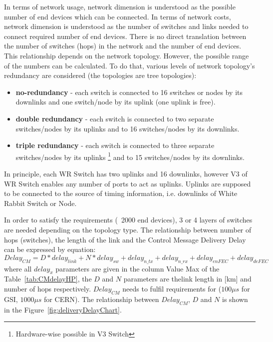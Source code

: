 In terms of network usage, network dimension is understood as the
possible number of end devices which can be connected. In terms of
network costs, network dimension is understood as the number of switches and
links needed to connect required number of end devices. There is no direct
translation between the number of switches (hops) in the network and the number
of end devices. This relationship depends on the network topology. However, the
possible range of the numbers can be calculated. To do that, various levels of
network topology's redundancy are considered (the topologies are tree
topologies):
\begin{itemize}
  \item \textbf{no-redundancy} - each switch is connected to 16 switches
or nodes by its downlinks and one switch/node by its uplink (one uplink is
free). 
  \item \textbf{double redundancy} - each switch is connected to two
separate switches/nodes by its uplinks and to 16 switches/nodes by its
downlinks. 
  \item \textbf{triple redundancy} - each switch is connected to three separate
switches/nodes by its uplinks \footnote{Hardware-wise possible in V3 Switch} and
to 15 switches/nodes by its downlinks. 

\end{itemize}

In principle, each WR Switch has two uplinks and 16 downlinks, however V3 of WR
Switch enables any number of ports to act as uplinks. Uplinks are supposed to
be connected to the source of timing information, i.e. downlinks of White Rabbit
Switch or Node. 

In order to satisfy the requirements (~2000 end devices), 3 or 4 layers of
switches are needed depending on the topology type. The relationship between
number of hops (switches), the length of the link and the Control Message
Delivery Delay can be expressed by equation:
\begin{equation}
	Delay_{CM} = D * delay_{link} + N * delay_{sw} + delay_{n\_tx}
+ delay_{n\_rx} + delay_{enFEC} + delay_{deFEC}
\end{equation}	
where all $delay_{x}$ parameters are given in the column Value Max of the
Table~\ref{tab:CMdelayHP}, the $D$ and $N$ parameters are thelink length in [km]
and number of hops respectively. $Delay_{CM}$ needs to fulfil requirements for
\GranularityWindow ($100\mu s$ for GSI, $1000\mu s$ for CERN).
The relationship between $Delay_{CM}$, $D$ and $N$ is shown in the
Figure~\ref{fig:deliveryDelayChart}.

